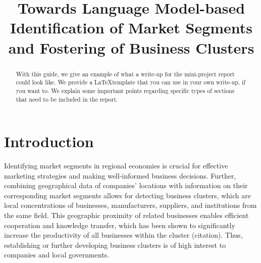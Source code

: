 \documentclass[conference]{IEEEtran}
\begin{document}
\title{Towards Language Model-based Identification of Market Segments and Fostering of Business Clusters}

\author{
\and
{}
\and
{}
\and
{}
\and
{}
}

\maketitle

\begin{abstract}
With this guide, we give an example of what a write-up for the mini-project report could look like. We provide a \LaTeX template that you 
can use in your own write-up, if you want to. We explain some important points regarding specific types of sections that need to be included in the report.
\end{abstract}


\section{Introduction}


Identifying market segments in regional economies is crucial for effective marketing strategies and making well-informed business decisions. Further, combining geographical data of companies' locations with information on their corresponding market segments allows for detecting business clusters, which are local concentrations of businesses, manufacturers, suppliers, and institutions from the same field. This geographic proximity of related businesses enables efficient cooperation and knowledge transfer, which has been shown to significantly increase the productivity of all businesses within the cluster (citation). Thus, establishing or further developing business clusters is of high interest to companies and local governments.
\end{document}
